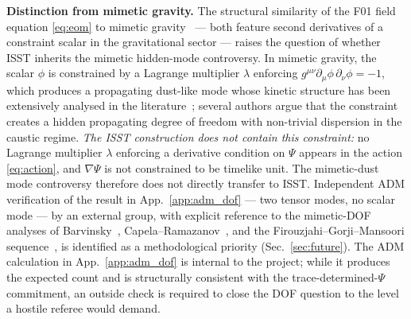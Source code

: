 \documentclass[aps,prd,twocolumn,nofootinbib,floatfix,superscriptaddress]{revtex4-2}
\begin{document}
\textbf{Distinction from mimetic gravity.} The structural similarity
of the F01 field equation \eqref{eq:eom} to mimetic
gravity~\cite{ChamseddineMukhanov2013} --- both feature second
derivatives of a constraint scalar in the gravitational sector
--- raises the question of whether ISST inherits the mimetic
hidden-mode controversy. In mimetic gravity, the scalar $\phi$ is
constrained by a Lagrange multiplier $\lambda$ enforcing
$g^{\mu\nu}\partial_\mu\phi\,\partial_\nu\phi = -1$, which produces
a propagating dust-like mode whose kinetic structure has been
extensively analysed in the
literature~\cite{Barvinsky2014,Capela2015,Firouzjahi2017,Gorji2018};
several authors argue that the constraint creates a hidden
propagating degree of freedom with non-trivial dispersion in the
caustic regime. \emph{The ISST construction does not contain this
constraint:} no Lagrange multiplier $\lambda$ enforcing a derivative
condition on $\Psi$ appears in the action \eqref{eq:action}, and
$\nabla\Psi$ is not constrained to be timelike unit. The
mimetic-dust mode controversy therefore does not directly transfer
to ISST. Independent ADM verification of the result in
App.~\ref{app:adm_dof} --- two tensor modes, no scalar mode ---
by an external group, with explicit reference to the mimetic-DOF
analyses of Barvinsky~\cite{Barvinsky2014},
Capela--Ramazanov~\cite{Capela2015}, and the
Firouzjahi--Gorji--Mansoori
sequence~\cite{Firouzjahi2017,Gorji2018}, is identified as a
methodological priority (Sec.~\ref{sec:future}). The ADM
calculation in App.~\ref{app:adm_dof} is internal to the project;
while it produces the expected count and is structurally consistent
with the trace-determined-$\Psi$ commitment, an outside check is
required to close the DOF question to the level a hostile referee
would demand.
\end{document}
